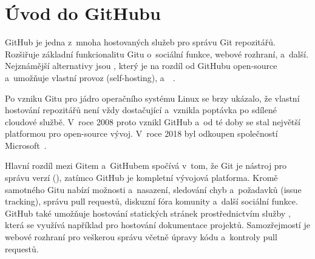 
\section{Úvod do GitHubu}
\label{sec:github_introduction}
GitHub je jedna z~mnoha hostovaných služeb pro správu Git repozitářů. Rozšiřuje základní funkcionalitu Gitu o~sociální funkce, webové rozhraní, \CICD a~další.
Nejznámější alternativy jsou , který je na rozdíl od GitHubu open-source a~umožňuje vlastní provoz (self-hosting), a~~\cite{psl_git_tutorial_main}.

Po vzniku Gitu pro jádro operačního systému Linux se brzy ukázalo, že vlastní hostování repozitářů není vždy dostačující a~vznikla poptávka po sdílené cloudové službě. V~roce 2008 proto vznikl GitHub a~od té doby se stal největší platformou pro open-source vývoj. V~roce 2018 byl odkoupen společností Microsoft~\cite{psl_git_tutorial_main}.

Hlavní rozdíl mezi Gitem a~GitHubem spočívá v~tom, že Git je nástroj pro správu verzí (\VCS), zatímco GitHub je kompletní vývojová platforma. Kromě samotného Gitu nabízí možnosti \CICD a~nasazení, sledování chyb a~požadavků (issue tracking), správu pull requestů, diskuzní fóra komunity a~další sociální funkce. GitHub také umožňuje hostování statických stránek prostřednictvím služby , která se využívá například pro hostování dokumentace projektů. Samozřejmostí je webové rozhraní pro veškerou správu včetně úpravy kódu a~kontroly pull requestů.
